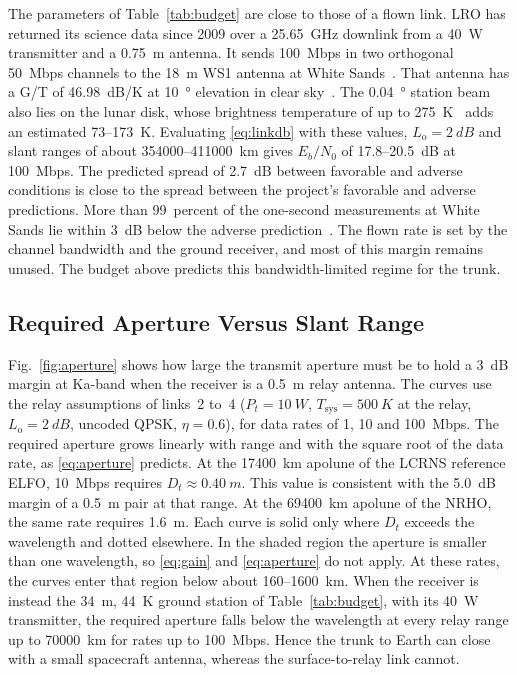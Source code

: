 \documentclass{IEEEoj}
\begin{document}
The parameters of Table~\ref{tab:budget} are close to those of a flown link. LRO has returned its science data since 2009 over a \SI{25.65}{GHz} downlink from a \SI{40}{W} transmitter and a \SI{0.75}{m} antenna. It sends \SI{100}{Mbps} in two orthogonal \SI{50}{Mbps} channels to the \SI{18}{m} WS1 antenna at White Sands~\cite{lro_ka_analysis}. That antenna has a G/T of \SI{46.98}{dB/K} at \SI{10}{\degree} elevation in clear sky~\cite{nen_ug_rev4}. The \SI{0.04}{\degree} station beam also lies on the lunar disk, whose brightness temperature of up to \SI{275}{K}~\cite{lro_ka_analysis} adds an estimated \SI{73}{}--\SI{173}{K}. Evaluating \eqref{eq:linkdb} with these values, $L_{\mathrm{o}} = \SI{2}{dB}$ and slant ranges of about \SI{354000}{}--\SI{411000}{km} gives $E_b/N_0$ of \SI{17.8}{}--\SI{20.5}{dB} at \SI{100}{Mbps}. The predicted spread of \SI{2.7}{dB} between favorable and adverse conditions is close to the spread between the project's favorable and adverse predictions. More than 99~percent of the one-second measurements at White Sands lie within \SI{3}{dB} below the adverse prediction~\cite{lro_ka_analysis}. The flown rate is set by the channel bandwidth and the ground receiver, and most of this margin remains unused. The budget above predicts this bandwidth-limited regime for the trunk.




\subsection{Required Aperture Versus Slant Range}
Fig.~\ref{fig:aperture} shows how large the transmit aperture must be to hold a \SI{3}{dB} margin at Ka-band when the receiver is a \SI{0.5}{m} relay antenna. The curves use the relay assumptions of links~2 to~4 ($P_t = \SI{10}{W}$, $T_{\mathrm{sys}} = \SI{500}{K}$ at the relay, $L_{\mathrm{o}} = \SI{2}{dB}$, uncoded QPSK, $\eta = 0.6$), for data rates of 1, 10 and \SI{100}{Mbps}. The required aperture grows linearly with range and with the square root of the data rate, as \eqref{eq:aperture} predicts. At the \SI{17400}{km} apolune of the LCRNS reference ELFO, \SI{10}{Mbps} requires $D_t \approx \SI{0.40}{m}$. This value is consistent with the \SI{5.0}{dB} margin of a \SI{0.5}{m} pair at that range. At the \SI{69400}{km} apolune of the NRHO, the same rate requires \SI{1.6}{m}. Each curve is solid only where $D_t$ exceeds the wavelength and dotted elsewhere. In the shaded region the aperture is smaller than one wavelength, so \eqref{eq:gain} and \eqref{eq:aperture} do not apply. At these rates, the curves enter that region below about \SI{160}{}--\SI{1600}{km}. When the receiver is instead the \SI{34}{m}, \SI{44}{K} ground station of Table~\ref{tab:budget}, with its \SI{40}{W} transmitter, the required aperture falls below the wavelength at every relay range up to \SI{70000}{km} for rates up to \SI{100}{Mbps}. Hence the trunk to Earth can close with a small spacecraft antenna, whereas the surface-to-relay link cannot.
\end{document}
